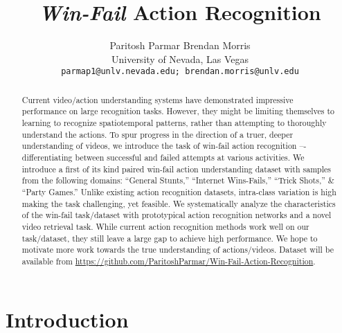 \documentclass[final]{cvpr}
\begin{document}
\title{\textit{Win-Fail} Action Recognition}

\author{Paritosh Parmar \hspace{1cm} Brendan Morris\\
University of Nevada, Las Vegas\\
{\tt\small parmap1@unlv.nevada.edu; brendan.morris@unlv.edu}
}

\maketitle


\begin{abstract}
Current video/action understanding systems have demonstrated impressive performance on large recognition tasks.  However, they might be limiting themselves to learning to recognize spatiotemporal patterns, rather than attempting to thoroughly understand the actions. To spur progress in the direction of a truer, deeper understanding of videos, we introduce the task of win-fail action recognition –- differentiating between successful and failed attempts at various activities.  We introduce a first of its kind paired win-fail action understanding dataset with samples from the following domains: ``General Stunts,'' ``Internet Wins-Fails,'' ``Trick Shots,'' \& ``Party Games.'' Unlike existing action recognition datasets, intra-class variation is high making the task challenging, yet feasible.  We systematically analyze the characteristics of the win-fail task/dataset with prototypical action recognition networks and a novel video retrieval task.  While current action recognition methods work well on our  task/dataset, they still leave a large gap to achieve high performance. We hope to motivate more work towards the true understanding of actions/videos. Dataset will be available from \url{https://github.com/ParitoshParmar/Win-Fail-Action-Recognition}.
\end{abstract} \section{Introduction}
\end{document}
